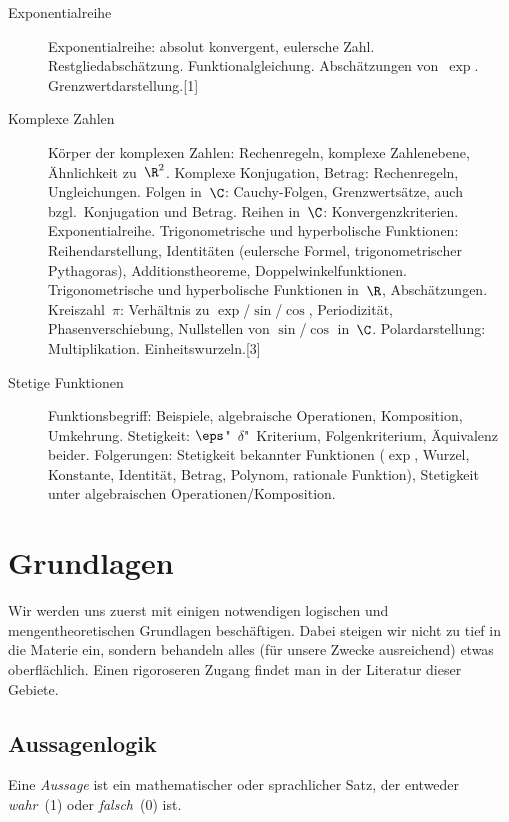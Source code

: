 \documentclass[a4paper]{article}
\begin{document}
\begin{description}
    \item[Exponentialreihe] Exponentialreihe: absolut konvergent, eulersche Zahl. Restgliedabschätzung. Funktionalgleichung. Abschätzungen von~$\exp$. Grenzwertdarstellung.\hspace*{\fill}[1]
    \item[Komplexe Zahlen] Körper der komplexen Zahlen: Rechenregeln, komplexe Zahlenebene, Ähnlichkeit zu~$\R^2$. Komplexe Konjugation, Betrag: Rechenregeln, Ungleichungen. Folgen in~$\C$: Cauchy-Folgen, Grenzwertsätze, auch bzgl.\ Konjugation und Betrag. Reihen in~$\C$: Konvergenzkriterien. Exponentialreihe. Trigonometrische und hyperbolische Funktionen: Reihendarstellung, Identitäten (eulersche Formel, trigonometrischer Pythagoras), Additionstheoreme, Doppelwinkelfunktionen. Trigonometrische und hyperbolische Funktionen in~$\R$, Abschätzungen. Kreiszahl~$\pi$: Verhältnis zu $\exp$/$\sin$/$\cos$, Periodizität, Phasenverschiebung, Nullstellen von $\sin$/$\cos$ in~$\C$. Polardarstellung: Multiplikation. Einheitswurzeln.\hspace*{\fill}[3]
    \item[Stetige Funktionen] Funktionsbegriff: Beispiele, algebraische Operationen, Komposition, Umkehrung. Stetigkeit: $\eps$"~$\delta$"~Kriterium, Folgenkriterium, Äquivalenz beider. Folgerungen: Stetigkeit bekannter Funktionen ($\exp$, Wurzel, Konstante, Identität, Betrag, Polynom, rationale Funktion), Stetigkeit unter algebraischen Operationen/Komposition. 
\end{description}

\newpage\tableofcontents

\section{Grundlagen}

Wir werden uns zuerst mit einigen notwendigen logischen und mengentheoretischen Grundlagen beschäftigen. Dabei steigen wir nicht zu tief in die Materie ein, sondern behandeln alles (für unsere Zwecke ausreichend) etwas oberflächlich. Einen rigoroseren Zugang findet man in der Literatur dieser Gebiete.

\subsection{Aussagenlogik}

\begin{definition}[Aussage]
    Eine \emph{Aussage} ist ein mathematischer oder sprachlicher Satz, der entweder \emph{wahr}~(1) oder \emph{falsch}~(0) ist.
\end{definition}
\end{document}
